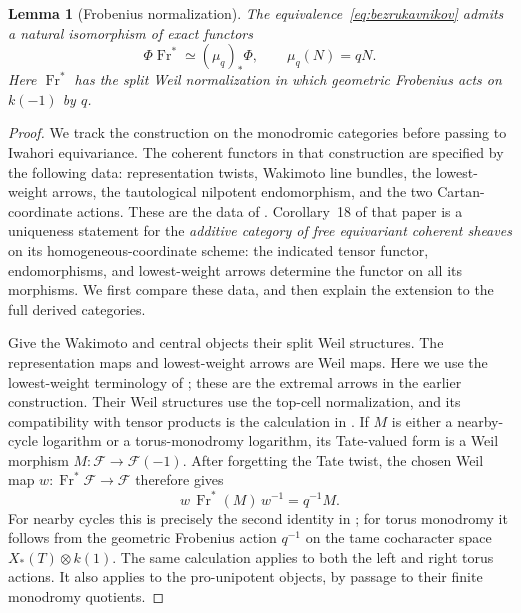 \documentclass[11pt]{article}
\numberwithin{equation}{section}
\newtheorem{lemma}[theorem]{Lemma}
\theoremstyle{definition}
\theoremstyle{remark}
\newcommand{\Fr}{\operatorname{Fr}}
\begin{document}
\begin{lemma}[Frobenius normalization]\label{enh:frobenius-normalization}
The equivalence~\eqref{eq:bezrukavnikov} admits a natural isomorphism
of exact functors
\[
 \Phi\Fr^*\simeq (\mu_q)_*\Phi,
 \qquad \mu_q(N)=qN.
\]
Here $\Fr^*$ has the split Weil normalization in which geometric
Frobenius acts on $k(-1)$ by $q$.
\end{lemma}

\begin{proof}
We track the construction on the monodromic categories before passing
to Iwahori equivariance.  The coherent functors in that construction
are specified by the following data: representation twists, Wakimoto
line bundles, the lowest-weight arrows, the tautological nilpotent
endomorphism, and the two Cartan-coordinate actions.  These are the
data of \cite[Sections~4.1.1--4.1.5 and~4.4.1]{Enh:Bezrukavnikov}.
Corollary~18 of that paper is a uniqueness statement for the
\emph{additive category of free equivariant coherent sheaves} on its
homogeneous-coordinate scheme: the indicated tensor functor,
endomorphisms, and lowest-weight arrows determine the functor on all
its morphisms.  We first compare these data, and then explain the
extension to the full derived categories.

Give the Wakimoto and central objects their split Weil structures.
The representation maps and lowest-weight arrows are Weil maps.
Here we use the lowest-weight terminology of
\cite[Section~4.1.3]{Enh:Bezrukavnikov}; these are the extremal
arrows in the earlier construction.  Their Weil structures use the
top-cell normalization, and
its compatibility with tensor products is the calculation in
\cite[Section~3.5, equations~(17)--(18)]{Enh:AB}.
If $M$ is either a nearby-cycle logarithm or a torus-monodromy
logarithm, its Tate-valued form is a Weil morphism
$M:\mathcal F\to\mathcal F(-1)$.  After forgetting the Tate twist,
the chosen Weil map $w:\Fr^*\mathcal F\to\mathcal F$ therefore gives
\begin{equation}\label{enh:monodromy-scaling}
 w\,\Fr^*(M)\,w^{-1}=q^{-1}M.
\end{equation}
For nearby cycles this is precisely the second identity in
\cite[Section~3.5, equation~(17)]{Enh:AB}; for torus monodromy it
follows from the geometric Frobenius action $q^{-1}$ on the tame
cocharacter space $X_*(T)\otimes k(1)$.
The same calculation applies to both the left and right torus
actions.  It also applies to the pro-unipotent objects, by passage
to their finite monodromy quotients.


\end{proof}
\end{document}
